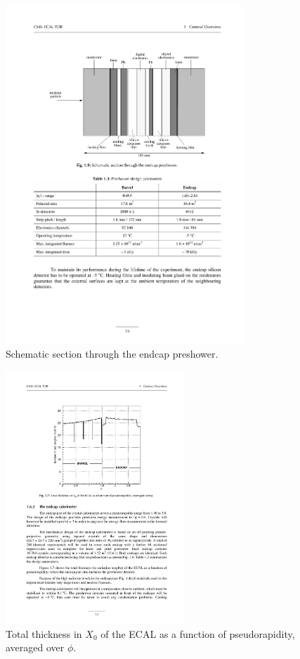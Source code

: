 \begin{figure}[h!]
\begin{center}
\includegraphics[width=0.8\textwidth]{figures/CMS/ECAL/ecalTDR/es-19.pdf}
\caption{Schematic section through the endcap preshower.}
\label{fig:CMS_Ecal_preshower}
\end{center}
\end{figure}


\begin{figure}[h!]
\begin{center}
\includegraphics[width=0.6\textwidth]{figures/CMS/ECAL/ecalTDR/material-budget-17.pdf}
\caption{Total thickness in $X_{0}$ of the ECAL as a function of pseudorapidity, averaged over $\phi$.}
\label{fig:CMS_Ecal_3}
\end{center}
\end{figure}

